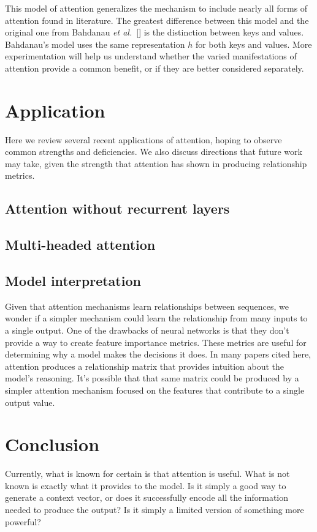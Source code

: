 \documentclass{article}
\newcommand{\etal}{\textit{et al.}}
\begin{document}
This model of attention generalizes the mechanism to include nearly all forms of attention found in literature. The greatest difference between this model and the original one from Bahdanau \etal~[\citeyear{joint_align_translate}] is the distinction between keys and values. Bahdanau's model uses the same representation $h$ for both keys and values. More experimentation will help us understand whether the varied manifestations of attention provide a common benefit, or if they are better considered separately.

\section{Application}

Here we review several recent applications of attention, hoping to observe common strengths and deficiencies. We also discuss directions that future work may take, given the strength that attention has shown in producing relationship metrics.

\subsection{Attention without recurrent layers}

\cite{attn_all_you_need}

\subsection{Multi-headed attention}\label{section:multi_headed}

\cite{attn_all_you_need}

\subsection{Model interpretation}

Given that attention mechanisms learn relationships between sequences, we wonder if a simpler mechanism could learn the relationship from many inputs to a single output. One of the drawbacks of neural networks is that they don't provide a way to create feature importance metrics. These metrics are useful for determining why a model makes the decisions it does. In many papers cited here, attention produces a relationship matrix that provides intuition about the model's reasoning. It's possible that that same matrix could be produced by a simpler attention mechanism focused on the features that contribute to a single output value.

\section{Conclusion}

Currently, what is known for certain is that attention is useful. What is not known is exactly what it provides to the model. Is it simply a good way to generate a context vector, or does it successfully encode all the information needed to produce the output? Is it simply a limited version of something more powerful?



\end{document}
